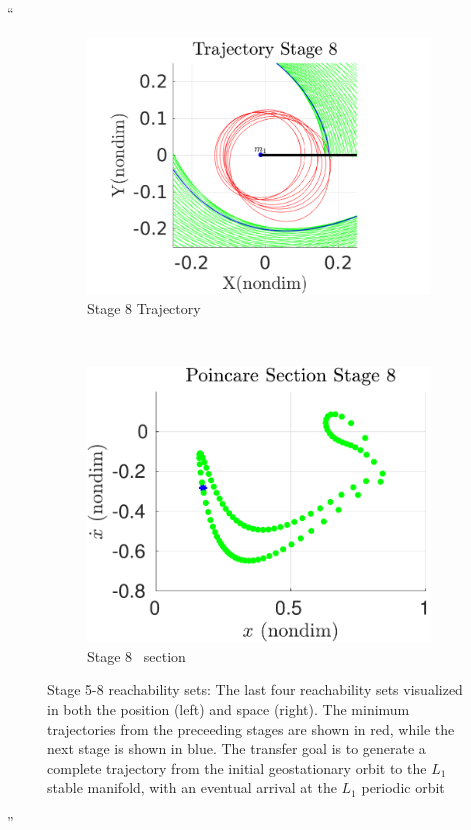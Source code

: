 \documentclass[11pt]{article}
\newenvironment{correction}{\begin{list}{}{\setlength{\leftmargin}{1cm}\setlength{\rightmargin}{1cm}}\vspace{\parsep}\item[]``}{''\end{list}}
\begin{document}
\begin{enumerate}
\begin{correction}
\begin{figure}[H]
    \begin{subfigure}[htbp]{0.2\textwidth} 
        \includegraphics[width=\textwidth, keepaspectratio]{figures/geo_transfer/stage8_trajectory_zoom.pdf} 
        \caption{Stage 8 Trajectory} 
    \end{subfigure}~
    \begin{subfigure}[htbp]{0.2\textwidth} 
        \includegraphics[width=\textwidth, keepaspectratio]{figures/geo_transfer/stage8_poincare.pdf} 
        \caption{Stage 8 \Poincare~section } 
    \end{subfigure}   
    \caption{Stage 5-8 reachability sets: The last four reachability sets visualized in both the position (left) and \Poincare space (right).
        The minimum trajectories from the preceeding stages are shown in red, while the next stage is shown in blue.
    The transfer goal is to generate a complete trajectory from the initial geostationary orbit to the \( L_1 \) stable manifold, with an eventual arrival at the \( L_1 \) periodic orbit}
\end{figure}
\end{correction}


\end{enumerate}
\end{document}
